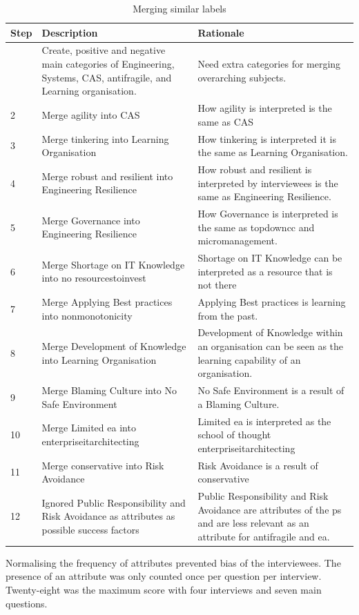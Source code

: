\begin{longtable}{@{}p{}p{}p{}@{}}
	\toprule%
	\textbf{Step} & \textbf{Description} & \textbf{Rationale} \\%
	\midrule%
	\endhead%
	\hline
	\endfoot%
	\caption[Merging similar labels]{Merging similar labels}
	\label{tab:prepmergingsimilarlabels}
	\endlastfoot%
	1	  & Create, positive and negative main categories of Engineering, Systems, CAS, \gls{antifragile}, and Learning organisation. & Need extra categories for merging overarching subjects. \\%
	2     & Merge \gls{agility} into CAS & How \gls{agility} is interpreted is the same as CAS \\%
	3     & Merge tinkering into Learning Organisation & How tinkering is interpreted it is the same as Learning Organisation. \\%
	4     & Merge \gls{robust} and \gls{resilient} into Engineering Resilience & How \gls{robust} and \gls{resilient} is interpreted by interviewees is the same as Engineering Resilience. \\%
	5     & Merge Governance into Engineering Resilience & How Governance is interpreted is the same as \gls{topdowncc} and \gls{micromanagement}. \\%
	6     & Merge Shortage on IT Knowledge into no \gls{resourcestoinvest} & Shortage on IT Knowledge can be interpreted as a resource that is not there \\%
	7     & Merge Applying Best practices into \gls{nonmonotonicity} & Applying Best practices is learning from the past. \\%
	8     & Merge Development of Knowledge into Learning Organisation & Development of Knowledge within an organisation can be seen as the learning capability of an organisation. \\%
	9     & Merge Blaming Culture into No Safe Environment & No Safe Environment is a result of a Blaming Culture. \\%
	10    & Merge Limited \acrshort{ea} into \gls{enterpriseitarchitecting} & Limited \acrshort{ea} is interpreted as the school of thought \gls{enterpriseitarchitecting} \\%
	11    & Merge conservative into Risk Avoidance & Risk Avoidance is a result of conservative \\%
	12	  & Ignored Public Responsibility and Risk Avoidance as \glspl{attribute} as possible success factors & Public Responsibility and Risk Avoidance are attributes of the \gls{ps} and are less relevant as an attribute for \gls{antifragile} and \acrshort{ea}. \\%
	\bottomrule%
\end{longtable}%
Normalising the frequency of \glspl{attribute} prevented bias of the interviewees. The presence of an attribute was only counted once per question per interview. Twenty-eight was the maximum score with four interviews and seven main questions.
 
